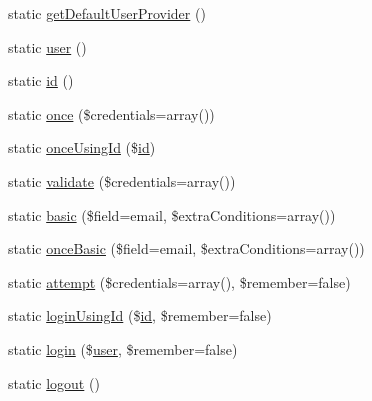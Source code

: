 \begin{DoxyCompactItemize}
\item 
static \mbox{\hyperlink{class_illuminate_1_1_support_1_1_facades_1_1_auth_a2b44e6e6ceebe194082a5ffe7db7aaaf}{get\+Default\+User\+Provider}} ()
\item 
static \mbox{\hyperlink{class_illuminate_1_1_support_1_1_facades_1_1_auth_a0e25fe7a8574e495c4e48ee60813f249}{user}} ()
\item 
static \mbox{\hyperlink{class_illuminate_1_1_support_1_1_facades_1_1_auth_ab98365becdcd81b76d4be5aaa6971a05}{id}} ()
\item 
static \mbox{\hyperlink{class_illuminate_1_1_support_1_1_facades_1_1_auth_a63d7ab8bd8f2fd996d828789d339566a}{once}} (\$credentials=array())
\item 
static \mbox{\hyperlink{class_illuminate_1_1_support_1_1_facades_1_1_auth_a91dc83481e1323700b6d3d69ce944f05}{once\+Using\+Id}} (\$\mbox{\hyperlink{class_illuminate_1_1_support_1_1_facades_1_1_auth_ab98365becdcd81b76d4be5aaa6971a05}{id}})
\item 
static \mbox{\hyperlink{class_illuminate_1_1_support_1_1_facades_1_1_auth_a3bae01dfeecf84ab4ab06d46ae4214f7}{validate}} (\$credentials=array())
\item 
static \mbox{\hyperlink{class_illuminate_1_1_support_1_1_facades_1_1_auth_af8f2ff30a669fd33795db2d7947aa4bd}{basic}} (\$field=\textquotesingle{}email\textquotesingle{}, \$extra\+Conditions=array())
\item 
static \mbox{\hyperlink{class_illuminate_1_1_support_1_1_facades_1_1_auth_a655de6df527a9ea10578d8b273166f22}{once\+Basic}} (\$field=\textquotesingle{}email\textquotesingle{}, \$extra\+Conditions=array())
\item 
static \mbox{\hyperlink{class_illuminate_1_1_support_1_1_facades_1_1_auth_aaae9451317576aa597277bac1aa2331d}{attempt}} (\$credentials=array(), \$remember=false)
\item 
static \mbox{\hyperlink{class_illuminate_1_1_support_1_1_facades_1_1_auth_a96b66e55dc3ced8f3c89e77171f01f4b}{login\+Using\+Id}} (\$\mbox{\hyperlink{class_illuminate_1_1_support_1_1_facades_1_1_auth_ab98365becdcd81b76d4be5aaa6971a05}{id}}, \$remember=false)
\item 
static \mbox{\hyperlink{class_illuminate_1_1_support_1_1_facades_1_1_auth_aeef81e7eab1a76858dfa1b5e2d251bf0}{login}} (\$\mbox{\hyperlink{class_illuminate_1_1_support_1_1_facades_1_1_auth_a0e25fe7a8574e495c4e48ee60813f249}{user}}, \$remember=false)
\item 
static \mbox{\hyperlink{class_illuminate_1_1_support_1_1_facades_1_1_auth_a53e1351df33655142a42751eba04297b}{logout}} ()

\end{DoxyCompactItemize}
